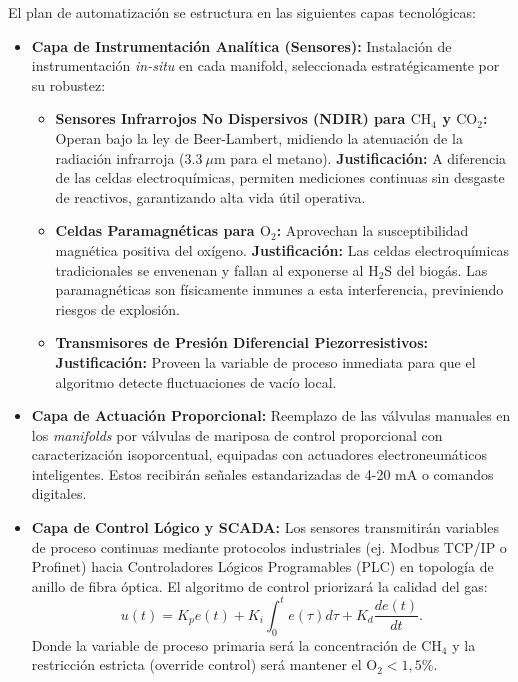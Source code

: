 \documentclass[11pt,letterpaper]{article}
\begin{document}
El plan de automatización se estructura en las siguientes capas tecnológicas:

\begin{itemize}
  \item \textbf{Capa de Instrumentación Analítica (Sensores):} Instalación de
    instrumentación \textit{in-situ} en cada manifold, seleccionada
    estratégicamente por su robustez:
    \begin{itemize}
      \item \textbf{Sensores Infrarrojos No Dispersivos (NDIR) para
        $\text{CH}_{4}$ y $\text{CO}_{2}$:} Operan bajo la ley de Beer-Lambert,
        midiendo la atenuación de la radiación infrarroja ($3.3~\mu\text{m}$
        para el metano). \textbf{Justificación:} A diferencia de las celdas
        electroquímicas, permiten mediciones continuas sin desgaste de
        reactivos, garantizando alta vida útil operativa.
      \item \textbf{Celdas Paramagnéticas para $\text{O}_{2}$:} Aprovechan la
        susceptibilidad magnética positiva del oxígeno.  \textbf{Justificación:}
        Las celdas electroquímicas tradicionales se envenenan y fallan al
        exponerse al $\text{H}_{2}\text{S}$ del biogás.  Las paramagnéticas son
        físicamente inmunes a esta interferencia, previniendo riesgos de
        explosión.
      \item \textbf{Transmisores de Presión Diferencial Piezorresistivos:}
        \textbf{Justificación:} Proveen la variable de proceso inmediata para
        que el algoritmo detecte fluctuaciones de vacío local.
    \end{itemize}

  \item \textbf{Capa de Actuación Proporcional:} Reemplazo de las válvulas
    manuales en los \textit{manifolds} por válvulas de mariposa de control
    proporcional con caracterización isoporcentual, equipadas con actuadores
    electroneumáticos inteligentes. Estos recibirán señales estandarizadas de
    4-20 mA o comandos digitales.

  \item \textbf{Capa de Control Lógico y SCADA:} Los sensores transmitirán
    variables de proceso continuas mediante protocolos industriales (ej. Modbus
    TCP/IP o Profinet) hacia Controladores Lógicos Programables (PLC) en
    topología de anillo de fibra óptica.  El algoritmo de control priorizará la
    calidad del gas:
    \begin{equation}
      u(t)=K_{p}e(t)+K_{i}\int_{0}^{t}e(\tau)d\tau+K_{d}\frac{de(t)}{dt}.
    \end{equation}
    Donde la variable de proceso primaria será la concentración de $\text{CH}_{4}$ y
    la restricción estricta (override control) será mantener el
    $\text{O}_{2}<1,5\%$.
\end{itemize}
\end{document}

